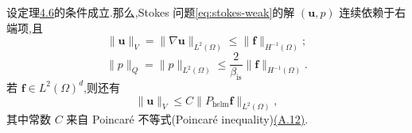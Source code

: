 \begin{lemma}[解的稳定性]\label{lem:stokes-stability}
设定理\hyperref[thm:stokes-4-6]{4.6}的条件成立.那么,Stokes 问题\cref{eq:stokes-weak}的解 $(\bm{u},p)$ 连续依赖于右端项,且
\begin{equation}\label{eq:stokes-velocity-stability}
  \|\bm{u}\|_V=\|\nabla\bm{u}\|_{L^2(\Omega)}
    \leq\|\bm{f}\|_{H^{-1}(\Omega)};
\end{equation}
\begin{equation}\label{eq:stokes-pressure-stability}
  \|p\|_Q=\|p\|_{L^2(\Omega)}
    \leq\frac{2}{\beta_{\mathrm{is}}}
          \|\bm{f}\|_{H^{-1}(\Omega)}.
\end{equation}
若 $\bm{f}\in L^2(\Omega)^d$,则还有
\begin{equation}\label{eq:stokes-helmholtz-stability}
  \|\bm{u}\|_V
    \leq C\|P_{\mathrm{helm}}\bm{f}\|_{L^2(\Omega)},
\end{equation}
其中常数 $C$ 来自 Poincaré 不等式(Poincar\'e inequality)\hyperref[eq:appendix-a-12]{(A.12)}.
\end{lemma}
